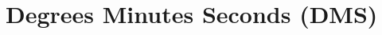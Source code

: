 \hypertarget{group___e_g_x_math-_angle_conversions-_d_m_s}{}\section{Degrees Minutes Seconds (D\+MS)}
\label{group___e_g_x_math-_angle_conversions-_d_m_s}
